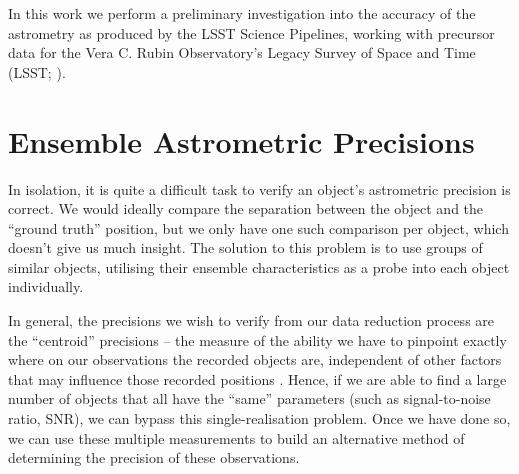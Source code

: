 \documentclass[SE,lsstdraft,authoryear,toc]{lsstdoc}
\begin{document}
In this work we perform a preliminary investigation into the accuracy of the astrometry as produced by the LSST Science Pipelines, working with precursor data for the Vera C. Rubin Observatory's Legacy Survey of Space and Time (LSST; \citealp{Ivezic2019}).

\section{Ensemble Astrometric Precisions}
In isolation, it is quite a difficult task to verify an object's astrometric precision is correct.
We would ideally compare the separation between the object and the ``ground truth'' position, but we only have one such comparison per object, which doesn't give us much insight.
The solution to this problem is to use groups of similar objects, utilising their ensemble characteristics as a probe into each object individually.

In general, the precisions we wish to verify from our data reduction process are the ``centroid'' precisions -- the measure of the ability we have to pinpoint exactly where on our observations the recorded objects are, independent of other factors that may influence those recorded positions \citep{2017MNRAS.468.2517W,2018MNRAS.481.2148W,Wilson2023}.
Hence, if we are able to find a large number of objects that all have the ``same'' parameters (such as signal-to-noise ratio, SNR), we can bypass this single-realisation problem.
Once we have done so, we can use these multiple measurements to build an alternative method of determining the precision of these observations.
\end{document}
